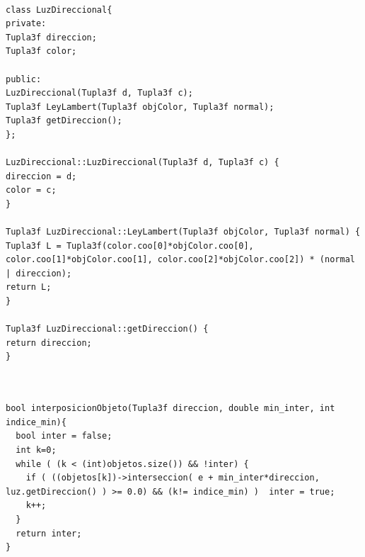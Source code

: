 \begin{lstlisting}[style=Consola]

class LuzDireccional{
private:
Tupla3f direccion;
Tupla3f color;

public:
LuzDireccional(Tupla3f d, Tupla3f c);
Tupla3f LeyLambert(Tupla3f objColor, Tupla3f normal);
Tupla3f getDireccion();
};

LuzDireccional::LuzDireccional(Tupla3f d, Tupla3f c) {
direccion = d;
color = c;
}

Tupla3f LuzDireccional::LeyLambert(Tupla3f objColor, Tupla3f normal) {
Tupla3f L = Tupla3f(color.coo[0]*objColor.coo[0], color.coo[1]*objColor.coo[1], color.coo[2]*objColor.coo[2]) * (normal | direccion);
return L;
}

Tupla3f LuzDireccional::getDireccion() {
return direccion;
}


\end{lstlisting}


\begin{lstlisting}[style=Consola]

bool interposicionObjeto(Tupla3f direccion, double min_inter, int indice_min){
  bool inter = false;
  int k=0;
  while ( (k < (int)objetos.size()) && !inter) {
    if ( ((objetos[k])->interseccion( e + min_inter*direccion, luz.getDireccion() ) >= 0.0) && (k!= indice_min) )  inter = true;
    k++;
  }
  return inter;
}

\end{lstlisting}